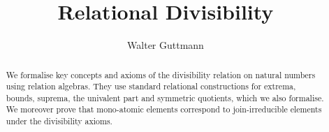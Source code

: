 \documentclass[11pt,a4paper]{article}
\begin{document}
\title{Relational Divisibility}
\author{Walter Guttmann}
\maketitle

\begin{abstract}
  We formalise key concepts and axioms of the divisibility relation on natural numbers using relation algebras.
  They use standard relational constructions for extrema, bounds, suprema, the univalent part and symmetric quotients, which we also formalise.
  We moreover prove that mono-atomic elements correspond to join-irreducible elements under the divisibility axioms.
\end{abstract}

\tableofcontents

\begin{flushleft}

\end{flushleft}



\end{document}
